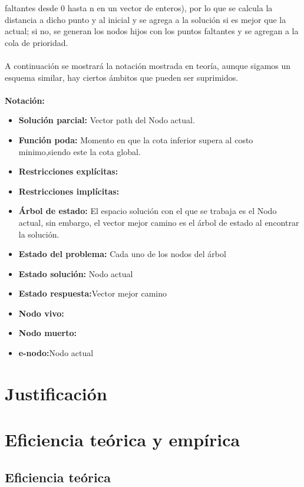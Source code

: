 \documentclass[11pt,openany]{book}
\begin{document}
faltantes desde 0 hasta n en un vector de enteros), por lo que se calcula la distancia a dicho punto y al inicial y se agrega a la solución si es 
mejor que la actual; si no, se generan los nodos hijos con los puntos faltantes y se agregan a la cola de prioridad.
\\ \\
A continuación se mostrará la notación mostrada en teoría, aunque sigamos un esquema similar, hay ciertos ámbitos que pueden ser suprimidos.
\\\\
\textbf{Notación:}
\begin{itemize}
      \item \textbf{Solución parcial:} Vector path del Nodo actual.
      \item \textbf{Función poda:} Momento en que la cota inferior supera al costo minimo,siendo este la cota global.
      \item \textbf{Restricciones explícitas:}
      \item \textbf{Restricciones implícitas:}
      \item \textbf{Árbol de estado:} El espacio solución con el que se trabaja es el Nodo actual, sin embargo, el 
      vector mejor camino es el árbol de estado al encontrar la solución.
      \item \textbf{Estado del problema:} Cada uno de los nodos del árbol
      \item \textbf{Estado solución:} Nodo actual
      \item \textbf{Estado respuesta:}Vector mejor camino
      \item \textbf{Nodo vivo:}
      \item \textbf{Nodo muerto:}
      \item \textbf{e-nodo:}Nodo actual
\end{itemize}


\newpage
\section{Justificación}

\newpage

\section{Eficiencia teórica y empírica}
\subsection{Eficiencia teórica}
\end{document}
